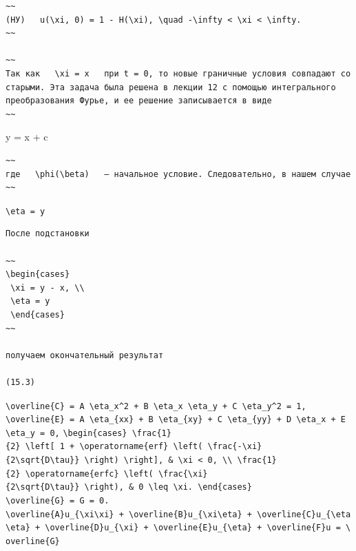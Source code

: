 \documentclass[
  ukrainian,
]{article}
\begin{document}
\begin{verbatim}
~~
(НУ)   u(\xi, 0) = 1 - H(\xi), \quad -\infty < \xi < \infty.
~~

~~
Так как   \xi = x   при t = 0, то новые граничные условия совпадают со старыми. Эта задача была решена в лекции 12 с помощью интегрального преобразования Фурье, и ее решение записывается в виде
~~
\end{verbatim}

y = x + c

\begin{verbatim}
~~
где   \phi(\beta)   — начальное условие. Следовательно, в нашем случае
~~
\end{verbatim}

\texttt{\textbackslash{}eta\ =\ y}

\begin{verbatim}
После подстановки

~~
\begin{cases}
 \xi = y - x, \\
 \eta = y
 \end{cases}
~~

получаем окончательный результат

(15.3)
\end{verbatim}

\texttt{\textbackslash{}overline\{C\}\ =\ A\ \textbackslash{}eta\_x\^{}2\ +\ B\ \textbackslash{}eta\_x\ \textbackslash{}eta\_y\ +\ C\ \textbackslash{}eta\_y\^{}2\ =\ 1,}
\texttt{\textbackslash{}overline\{E\}\ =\ A\ \textbackslash{}eta\_\{xx\}\ +\ B\ \textbackslash{}eta\_\{xy\}\ +\ C\ \textbackslash{}eta\_\{yy\}\ +\ D\ \textbackslash{}eta\_x\ +\ E\ \textbackslash{}eta\_y\ =\ 0,}
\texttt{\textbackslash{}begin\{cases\}\ \textbackslash{}frac\{1\}\{2\}\ \textbackslash{}left{[}\ 1\ +\ \textbackslash{}operatorname\{erf\}\ \textbackslash{}left(\ \textbackslash{}frac\{-\textbackslash{}xi\}\{2\textbackslash{}sqrt\{D\textbackslash{}tau\}\}\ \textbackslash{}right)\ \textbackslash{}right{]},\ \&\ \textbackslash{}xi\ \textless{}\ 0,\ \textbackslash{}\textbackslash{}\ \textbackslash{}frac\{1\}\{2\}\ \textbackslash{}operatorname\{erfc\}\ \textbackslash{}left(\ \textbackslash{}frac\{\textbackslash{}xi\}\{2\textbackslash{}sqrt\{D\textbackslash{}tau\}\}\ \textbackslash{}right),\ \&\ 0\ \textbackslash{}leq\ \textbackslash{}xi.\ \textbackslash{}end\{cases\}}
\texttt{\textbackslash{}overline\{G\}\ =\ G\ =\ 0.}
\texttt{\textbackslash{}overline\{A\}u\_\{\textbackslash{}xi\textbackslash{}xi\}\ +\ \textbackslash{}overline\{B\}u\_\{\textbackslash{}xi\textbackslash{}eta\}\ +\ \textbackslash{}overline\{C\}u\_\{\textbackslash{}eta\textbackslash{}eta\}\ +\ \textbackslash{}overline\{D\}u\_\{\textbackslash{}xi\}\ +\ \textbackslash{}overline\{E\}u\_\{\textbackslash{}eta\}\ +\ \textbackslash{}overline\{F\}u\ =\ \textbackslash{}overline\{G\}}
\end{document}
